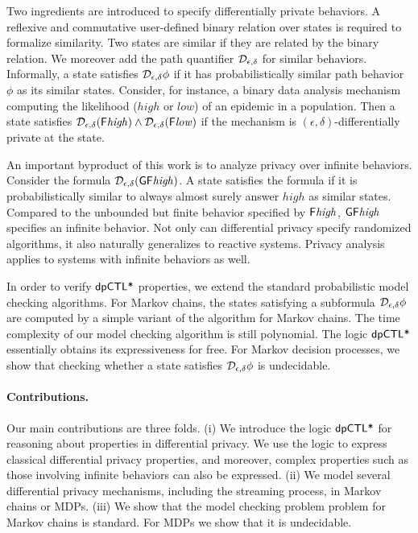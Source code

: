 
Two ingredients are introduced to specify differentially private
behaviors. A reflexive and commutative user-defined binary relation
over states is required to formalize similarity. Two states are
similar if they are related by the binary relation. We moreover add
the path quantifier $\mathcal{D}_{{\epsilon}, {\delta}}$ for similar
behaviors. Informally, a state satisfies $\mathcal{D}_{{\epsilon}, {\delta}}
\phi$ if it has probabilistically similar path behavior $\phi$ as
its similar states. Consider, for instance, a binary data analysis
mechanism computing the likelihood ($\mathit{high}$ or $\mathit{low}$)
of an epidemic in a population. Then a state satisfies
$\mathcal{D}_{{\epsilon}, {\delta}} (\mathsf{F} \mathit{high}) \wedge
\mathcal{D}_{{\epsilon}, {\delta}} (\mathsf{F} \mathit{low})$ if the mechanism is
$(\epsilon, \delta)$-differentially private at the state.


An important byproduct of this work is to analyze privacy over
infinite behaviors. Consider the formula $\mathcal{D}_{{\epsilon}, {\delta}}
(\mathsf{G} \mathsf{F} \mathit{high})$. A state satisfies the formula if it
is probabilistically similar to always almost surely
answer $\mathit{high}$ as similar states. Compared to the unbounded
but finite behavior specified by $\mathsf{F} \mathit{high}$,
$\mathsf{G} \mathsf{F} \mathit{high}$ specifies an infinite behavior.
Not only can differential privacy specify randomized algorithms, it
also naturally generalizes to reactive systems.
Privacy analysis applies to systems with infinite behaviors as well.


In order to verify $\textsf{dpCTL*}$ properties, we extend the standard
probabilistic model checking algorithms. For Markov chains, the states
satisfying a subformula $\mathcal{D}_{{\epsilon}, {\delta}} \phi$ are computed
by a simple variant of the algorithm for Markov chains.
The time complexity of our model checking algorithm is
still polynomial. The logic $\textsf{dpCTL*}$ essentially obtains its
expressiveness for free. 
For Markov decision processes, we show that checking whether a state
satisfies $\mathcal{D}_{{\epsilon}, {\delta}} \phi$ is undecidable.


\paragraph{Contributions.} Our main contributions are three folds. (i)
We introduce the logic $\textsf{dpCTL*}$ for reasoning about properties in 
differential privacy. We use the logic to express classical
differential privacy properties, and moreover, complex properties such as those 
involving infinite behaviors can also be expressed. (ii) We model several differential privacy mechanisms, including the streaming process, in Markov chains or MDPs.
(iii) We show that the model checking problem 
problem for Markov chains is standard. For MDPs we show that it is undecidable.  
